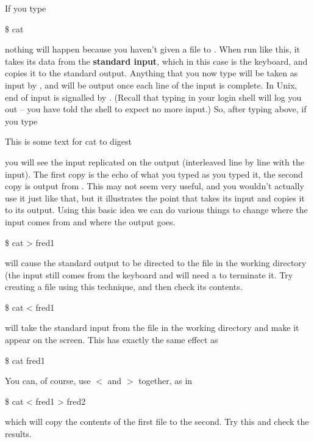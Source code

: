 If you type  
\begin{ttoutenv}
\$  cat \return
\end{ttoutenv}
nothing will happen because you haven't given a file to .
When run like this, it takes its data from the \textbf{standard input},
which in this case is the keyboard, and copies it to the standard
output. Anything that you now type will be taken as input by
, and will be output once each line of the input is
complete. In Unix, end of input is signalled by .
(Recall that typing  in your login shell will log you
out -- you have told the shell to expect no more input.) So, after
typing  above, if you type 
\begin{ttoutenv}
This is
some 
text for cat to 
digest
\end{ttoutenv}
you will see the input replicated on the output (interleaved line by
line with the input). The first copy is the echo of what you typed as
you typed it, the second copy is output from . This may
not seem very useful, and you wouldn't actually use it just like that,
but it illustrates the point that  takes its input and copies it
to its output. Using this basic idea we can do various things to
change where the input comes from and where the output goes.

\begin{ttoutenv}
\$  cat > fred1
\end{ttoutenv}
will cause the standard output to be directed to the file 
in the working directory (the input still comes from the keyboard and
will need a  to terminate it. Try creating a file
 using this technique, and then check its contents.

\begin{ttoutenv}
\$  cat < fred1 
\end{ttoutenv}
will take the standard input from the file 
in the working directory and make it appear on the screen. This has
exactly the same effect as 
\begin{ttoutenv}
\$  cat fred1 
\end{ttoutenv}

You can, of course, use $<$ and $>$ together, as in
\begin{ttoutenv}
\$  cat < fred1 > fred2
\end{ttoutenv}
which will copy the contents of the first file to the second. Try this and
check the results.

